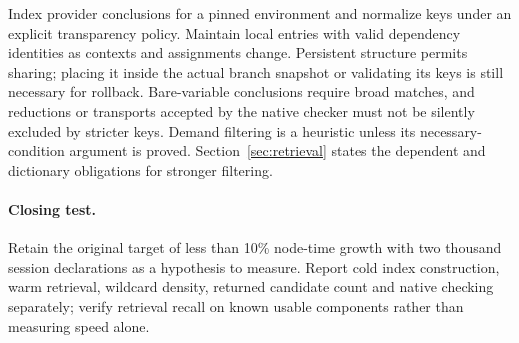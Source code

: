 Index provider conclusions for a pinned environment and normalize keys under
an explicit transparency policy. Maintain local entries with valid dependency
identities as contexts and assignments change. Persistent structure permits
sharing; placing it inside the actual branch snapshot or validating its keys
is still necessary for rollback. Bare-variable conclusions require broad
matches, and reductions or transports accepted by the native checker must not
be silently excluded by stricter keys. Demand filtering is a heuristic unless
its necessary-condition argument is proved. Section~\ref{sec:retrieval}
states the dependent and dictionary obligations for stronger filtering.

\paragraph{Closing test.} Retain the original target of less than 10\% node-time
growth with two thousand session declarations as a hypothesis to measure.
Report cold index construction, warm retrieval, wildcard density, returned
candidate count and native checking separately; verify retrieval recall on
known usable components rather than measuring speed alone.
